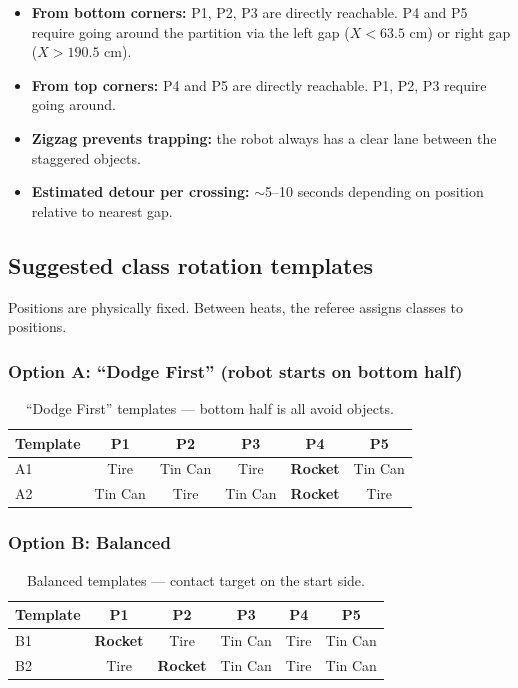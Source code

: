 \documentclass[a4]{article}
\begin{document}
\begin{itemize}
    \item \textbf{From bottom corners:} P1, P2, P3 are directly reachable. P4 and P5 require going around the partition via the left gap ($X < 63.5$ cm) or right gap ($X > 190.5$ cm).
    \item \textbf{From top corners:} P4 and P5 are directly reachable. P1, P2, P3 require going around.
    \item \textbf{Zigzag prevents trapping:} the robot always has a clear lane between the staggered objects.
    \item \textbf{Estimated detour per crossing:} $\sim$5--10 seconds depending on position relative to nearest gap.
\end{itemize}

\subsection*{Suggested class rotation templates}

Positions are physically fixed. Between heats, the referee assigns classes to positions.

\subsubsection*{Option A: ``Dodge First'' (robot starts on bottom half)}

\begin{table}[H]
\centering
\begin{tabular}{lccccc}
\toprule
\textbf{Template} & \textbf{P1} & \textbf{P2} & \textbf{P3} & \textbf{P4} & \textbf{P5} \\
\midrule
A1 & Tire & Tin Can & Tire & \textbf{Rocket} & Tin Can \\
A2 & Tin Can & Tire & Tin Can & \textbf{Rocket} & Tire \\
\bottomrule
\end{tabular}
\caption{``Dodge First'' templates --- bottom half is all avoid objects.}
\end{table}

\subsubsection*{Option B: Balanced}

\begin{table}[H]
\centering
\begin{tabular}{lccccc}
\toprule
\textbf{Template} & \textbf{P1} & \textbf{P2} & \textbf{P3} & \textbf{P4} & \textbf{P5} \\
\midrule
B1 & \textbf{Rocket} & Tire & Tin Can & Tire & Tin Can \\
B2 & Tire & \textbf{Rocket} & Tin Can & Tire & Tin Can \\
\bottomrule
\end{tabular}
\caption{Balanced templates --- contact target on the start side.}
\end{table}
\end{document}
